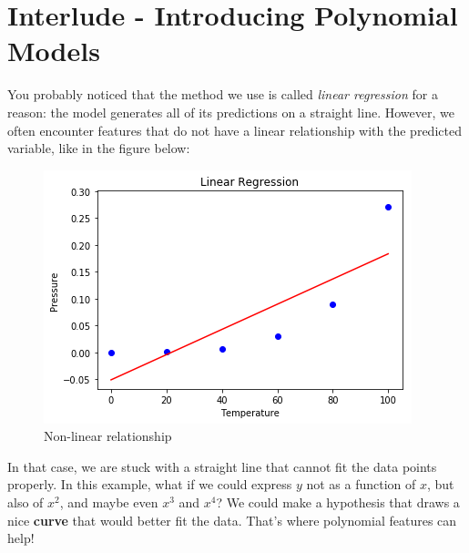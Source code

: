 
\section*{Interlude - Introducing Polynomial Models}

You probably noticed that the method we use is called \textit{linear regression} for a reason:
the model generates all of its predictions on a straight line.
However, we often encounter features that do not have a linear relationship with the predicted variable,
like in the figure below:

\begin{figure}[!h]
    \centering
    \includegraphics[scale=0.6]{assets/polynomial_straight_line.png}
    \caption{Non-linear relationship}
\end{figure}

In that case, we are stuck with a straight line that cannot fit the data points properly.
In this example, what if we could express $y$ not as a function of $x$, but also of $x^2$, and maybe even $x^3$ and $x^4$?
We could make a hypothesis that draws a nice \textbf{curve} that would better fit the data.
That's where polynomial features can help!

